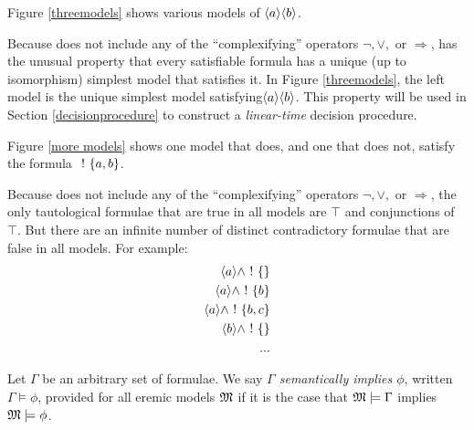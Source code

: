 \begin{example}
Figure \ref{threemodels} shows various models of $\MAY{a} \MAY{b}$. 

Because \ELABR{} does not include any of the ``complexifying'' operators $\neg, \lor, $ or $\Rightarrow$, \ELABR{} has the unusual property that every satisfiable formula has a unique (up to isomorphism) simplest model that satisfies it.
In Figure \ref{threemodels}, the left model is the unique simplest model satisfying$\MAY{a} \MAY{b}$.
This property will be used in Section \ref{decisionprocedure} to construct a \emph{linear-time} decision procedure.

\end{example}

\begin{example}
Figure \ref{more models} shows one model that does, and one that does not, satisfy the formula $\ ! \  \{a,b\}$.


\end{example}

\begin{example}
Because \ELABR{} does not include any of the ``complexifying'' operators $\neg, \lor, $ or $\Rightarrow$, the only tautological formulae that are true in all models are $\top$ and conjunctions of $\top$.
But there are an infinite number of distinct contradictory formulae that are false in all models.
For example:
\begin{eqnarray*}
\langle a \rangle \land \ ! \  \{\} \\
\langle a \rangle \land \ ! \  \{b\} \\
\langle a \rangle \land \ ! \  \{b, c\} \\
\langle b \rangle \land \ ! \  \{\} \\
...
\end{eqnarray*}
\end{example}

\begin{definition}
Let $\Gamma$ be an arbitrary set of formulae. We say \emph{$\Gamma$
  semantically implies $\phi$}, written $\Gamma \models \phi$,
provided for all eremic models $\frak{M}$ if it is the case that $\frak{M}
\models \Gamma$ implies $\frak{M} \models \phi$. 
\end{definition}

